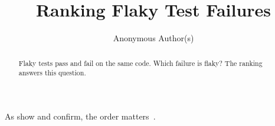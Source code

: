 \documentclass[sigconf]{acmart}
\begin{document}
\title{Ranking Flaky Test Failures}
\author{Anonymous Author(s)}
\begin{abstract}
Flaky tests pass and fail on the same code. Which failure is flaky? The ranking answers this question.
\end{abstract}
\maketitle

As \citet{luo2014} show and \citeauthor{bell2018} confirm, the order matters~\citep{parry2021}.


\end{document}
